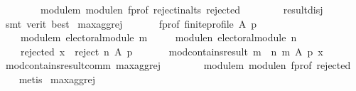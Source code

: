 \begin{isabellebody}
\ \ \ \ \ \ \ \ module{\isacharunderscore}{\kern0pt}m\ module{\isacharunderscore}{\kern0pt}n\ f{\isacharunderscore}{\kern0pt}prof\ reject{\isacharunderscore}{\kern0pt}in{\isacharunderscore}{\kern0pt}alts\ rejected\isanewline
\ \ \ \ \ \ \ \ result{\isacharunderscore}{\kern0pt}disj\isanewline
\ \ \isamarkupfalse%
\ {\isacharparenleft}{\kern0pt}smt\ {\isacharparenleft}{\kern0pt}verit{\isacharcomma}{\kern0pt}\ best{\isacharparenright}{\kern0pt}{\isacharparenright}{\kern0pt}%
\endisatagproof
{\isafoldproof}%
%
\isadelimproof
\isanewline
%
\endisadelimproof
\isanewline
{}\isamarkupfalse%
\ max{\isacharunderscore}{\kern0pt}agg{\isacharunderscore}{\kern0pt}rej{}{\isacharcolon}{\kern0pt}\isanewline
\ \ \isanewline
\ \ \ \ f{\isacharunderscore}{\kern0pt}prof{\isacharcolon}{\kern0pt}\ {\isachardoublequoteopen}finite{\isacharunderscore}{\kern0pt}profile\ A\ p{\isachardoublequoteclose}\ \isanewline
\ \ \ \ module{\isacharunderscore}{\kern0pt}m{\isacharcolon}{\kern0pt}\ {\isachardoublequoteopen}electoral{\isacharunderscore}{\kern0pt}module\ m{\isachardoublequoteclose}\ \isanewline
\ \ \ \ module{\isacharunderscore}{\kern0pt}n{\isacharcolon}{\kern0pt}\ {\isachardoublequoteopen}electoral{\isacharunderscore}{\kern0pt}module\ n{\isachardoublequoteclose}\ \isanewline
\ \ \ \ rejected{\isacharcolon}{\kern0pt}\ {\isachardoublequoteopen}x\ {\isasymin}\ reject\ n\ A\ p{\isachardoublequoteclose}\isanewline
\ \ \isanewline
\ \ \ \ {\isachardoublequoteopen}mod{\isacharunderscore}{\kern0pt}contains{\isacharunderscore}{\kern0pt}result\ {\isacharparenleft}{\kern0pt}m\ {\isasymparallel}\isactrlsub {\isasymup}\ n{\isacharparenright}{\kern0pt}\ m\ A\ p\ x{\isachardoublequoteclose}\isanewline
%
\isadelimproof
\ \ %
\endisadelimproof
%
\isatagproof
{}\isamarkupfalse%
\ mod{\isacharunderscore}{\kern0pt}contains{\isacharunderscore}{\kern0pt}result{\isacharunderscore}{\kern0pt}comm\ max{\isacharunderscore}{\kern0pt}agg{\isacharunderscore}{\kern0pt}rej{}\isanewline
\ \ \ \ \ \ \ \ module{\isacharunderscore}{\kern0pt}m\ module{\isacharunderscore}{\kern0pt}n\ f{\isacharunderscore}{\kern0pt}prof\ rejected\isanewline
\ \ \isamarkupfalse%
\ metis%
\endisatagproof
{\isafoldproof}%
%
\isadelimproof
\isanewline
%
\endisadelimproof
\isanewline
{}\isamarkupfalse%
\ max{\isacharunderscore}{\kern0pt}agg{\isacharunderscore}{\kern0pt}rej{}{\isacharcolon}{\kern0pt}\isanewline
\ \ \isanewline

\end{isabellebody}
